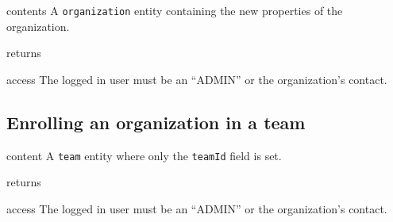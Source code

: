 \begin{apidata}{contents}
  A \texttt{organization} entity containing the new properties of the
  organization.
\end{apidata}
\begin{apidata}{returns}
  \begin{datalist}
  \end{datalist}
\end{apidata}
\begin{apidata}{access}
The logged in user must be an ``ADMIN'' or the organization's contact.
\end{apidata}


\subsection{Enrolling an organization in a team}

\begin{apidata}{content}
  A \texttt{team} entity where only the \texttt{teamId} field is set.
\end{apidata}
\begin{apidata}{returns}
  \begin{datalist}
  \end{datalist}
\end{apidata}
\begin{apidata}{access}
The logged in user must be an ``ADMIN'' or the organization's contact.
\end{apidata}

